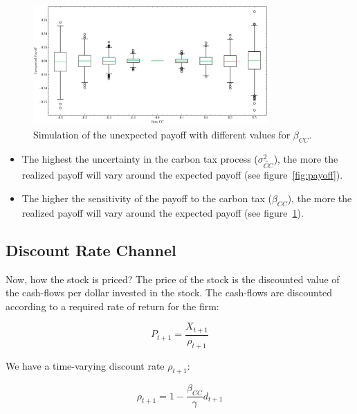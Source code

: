 \begin{figure}[htbp]
    \centering
    \includegraphics[width=0.8\textwidth]{../images/chapter01/unexpected_payoff_beta_cc.png}
    \caption{Simulation of the unexpected payoff with different values for $\beta_{CC}$.}
    \label{fig:payoff_beta}
\end{figure}



\begin{itemize}
    \item The highest the uncertainty in the carbon tax process ($\sigma_{\tilde{CC}}^2$),
    the more the realized payoff will vary around the expected payoff (see figure~\ref{fig:payoff}).
    \item The higher the sensitivity of the payoff to the carbon tax ($\beta_{CC}$),
    the more the realized payoff will vary around the expected payoff (see figure~\ref{fig:payoff_beta}).    
\end{itemize}




\subsection{Discount Rate Channel}

Now, how the stock is priced? 
The price of the stock is the discounted value of the 
cash-flows per dollar invested in the stock.
The cash-flows are discounted according 
to a required rate of return for the firm:

\begin{equation}
    P_{t+1} = \frac{X_{t+1}}{\rho_{t+1}}
\end{equation}

We have a time-varying discount rate $\rho_{t+1}$:

\begin{equation}
    \rho_{t+1} = 1 - \frac{\beta_{CC}}{\gamma} d_{t+1}
\end{equation}

